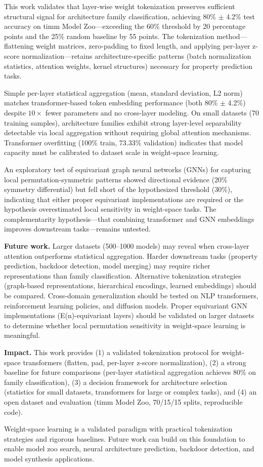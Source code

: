 
This work validates that layer-wise weight tokenization preserves sufficient structural signal for architecture family classification, achieving 80\% $\pm$ 4.2\% test accuracy on timm Model Zoo---exceeding the 60\% threshold by 20 percentage points and the 25\% random baseline by 55 points. The tokenization method---flattening weight matrices, zero-padding to fixed length, and applying per-layer z-score normalization---retains architecture-specific patterns (batch normalization statistics, attention weights, kernel structures) necessary for property prediction tasks.

Simple per-layer statistical aggregation (mean, standard deviation, L2 norm) matches transformer-based token embedding performance (both 80\% $\pm$ 4.2\%) despite $10\times$ fewer parameters and no cross-layer modeling. On small datasets (70 training samples), architecture families exhibit strong layer-level separability detectable via local aggregation without requiring global attention mechanisms. Transformer overfitting (100\% train, 73.33\% validation) indicates that model capacity must be calibrated to dataset scale in weight-space learning.

An exploratory test of equivariant graph neural networks (GNNs) for capturing local permutation-symmetric patterns showed directional evidence (20\% symmetry differential) but fell short of the hypothesized threshold (30\%), indicating that either proper equivariant implementations are required or the hypothesis overestimated local sensitivity in weight-space tasks. The complementarity hypothesis---that combining transformer and GNN embeddings improves downstream tasks---remains untested.

\textbf{Future work.} Larger datasets (500--1000 models) may reveal when cross-layer attention outperforms statistical aggregation. Harder downstream tasks (property prediction, backdoor detection, model merging) may require richer representations than family classification. Alternative tokenization strategies (graph-based representations, hierarchical encodings, learned embeddings) should be compared. Cross-domain generalization should be tested on NLP transformers, reinforcement learning policies, and diffusion models. Proper equivariant GNN implementations (E(n)-equivariant layers) should be validated on larger datasets to determine whether local permutation sensitivity in weight-space learning is meaningful.

\textbf{Impact.} This work provides (1) a validated tokenization protocol for weight-space transformers (flatten, pad, per-layer z-score normalization), (2) a strong baseline for future comparisons (per-layer statistical aggregation achieves 80\% on family classification), (3) a decision framework for architecture selection (statistics for small datasets, transformers for large or complex tasks), and (4) an open dataset and evaluation (timm Model Zoo, 70/15/15 splits, reproducible code).

Weight-space learning is a validated paradigm with practical tokenization strategies and rigorous baselines. Future work can build on this foundation to enable model zoo search, neural architecture prediction, backdoor detection, and model synthesis applications.
